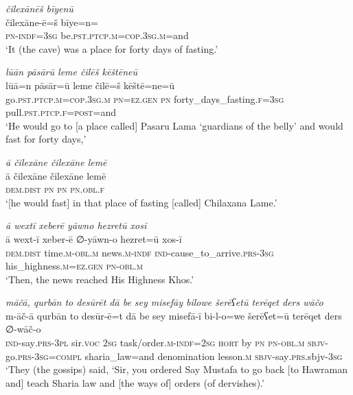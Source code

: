 \ea \label{ŽP.120}
\textit{čilexānēš bīyenū} \\ 
\gll čilexāne-ē=š bīye=n=\\ 
 \textsc{pn}\textsc{-indf}\textsc{=3sg} be\textsc{.pst}\textsc{.ptcp}\textsc{.m}\textsc{=cop}\textsc{.3sg}\textsc{.m}=and \\ 
\glt `It (the cave) was a place for forty days of fasting.'
\z 
 
\ea \label{ŽP.122}
\textit{lūān pāsārū leme čilēš kēštēneū} \\ 
\gll lūā=n pāsār=ū leme čilē=š kēštē=ne=ū \\ 
 go\textsc{.pst}\textsc{.ptcp}\textsc{.m}\textsc{=cop}\textsc{.3sg}\textsc{.m} \textsc{pn}\textsc{\textsc{=ez.gen}} \textsc{pn} forty\_days\_fasting\textsc{.f}\textsc{=3sg} pull\textsc{.pst}\textsc{.ptcp}\textsc{.f}\textsc{=\textsc{post}}=and \\ 
\glt `He would go to [a place called] Pasaru Lama ‘guardians of the belly’ and would fast for forty days,'
\z 
 
\ea \label{ŽP.123}
\textit{ā čilexāne čilexāne lemē} \\ 
\gll ā čilexāne čilexāne lemē \\ 
 \textsc{dem.dist} \textsc{pn} \textsc{pn} \textsc{pn}\textsc{.obl}\textsc{.f} \\ 
\glt `[he would fast] in that place of fasting [called] Chilaxana Lame.'
\z 
 
\ea \label{ŽP.124}
\textit{ā wextī xeberē yāwno hezretū xosī} \\ 
\gll ā wext-ī xeber-ē ∅-yāwn-o hezret=ū xos-ī \\ 
 \textsc{dem.dist} time\textsc{.m}\textsc{-obl}\textsc{.m} news\textsc{.m}\textsc{-indf} \textsc{ind-}cause\_to\_arrive\textsc{.prs}\textsc{-3sg} his\_highness\textsc{.m}\textsc{\textsc{=ez.gen}} \textsc{pn}\textsc{-obl}\textsc{.m} \\ 
\glt `Then, the news reached His Highness Khos.'
\z 
 
\ea \label{ŽP.126}
\textit{māčā, qurbān to desūrēt dā be sey misefāy bilowe šerēʕetū terēqet ders wāčo} \\ 
\gll m-āč-ā qurbān to desūr-ē=t dā be sey misefā-ī bi-l-o=we šerēʕet=ū terēqet ders ∅-wāč-o \\ 
 \textsc{ind-}say\textsc{.prs}\textsc{-3pl} sir.\textsc{voc} \textsc{2sg} task/order\textsc{.m}\textsc{-indf}\textsc{=\textsc{2sg}} \textsc{hort} by \textsc{pn} \textsc{pn}\textsc{-obl}\textsc{.m} \textsc{sbjv-}go\textsc{.prs}\textsc{-3sg}\textsc{=compl} sharia\_law=and denomination lesson\textsc{.m} \textsc{sbjv-}say\textsc{.prs}.sbjv\textsc{-3sg} \\ 
\glt `They (the gossips) said, ‘Sir, you ordered Say Mustafa to go back [to Hawraman and] teach Sharia law and [the ways of] orders (of dervishes).'
\z 
 

